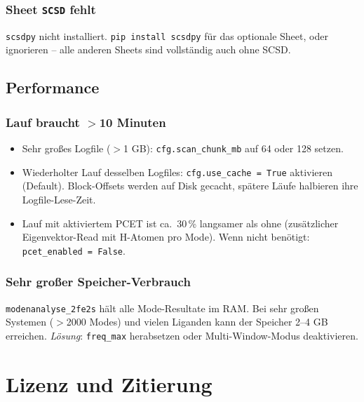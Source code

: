 \documentclass[11pt,a4paper,twoside]{article}
\theoremstyle{remark}
\begin{document}
\subsubsection*{Sheet \texttt{SCSD} fehlt}

\texttt{scsdpy} nicht installiert. \texttt{pip install scsdpy} f\"ur
das optionale Sheet, oder ignorieren -- alle anderen Sheets sind
vollst\"andig auch ohne SCSD.

\subsection{Performance}

\subsubsection*{Lauf braucht $>$10 Minuten}

\begin{itemize}
  \item Sehr gro\ss es Logfile ($>$1 GB): \texttt{cfg.scan\_chunk\_mb}
        auf 64 oder 128 setzen.
  \item Wiederholter Lauf desselben Logfiles: \texttt{cfg.use\_cache =
        True} aktivieren (Default). Block-Offsets werden auf Disk
        gecacht, sp\"atere L\"aufe halbieren ihre Logfile-Lese-Zeit.
  \item Lauf mit aktiviertem PCET ist ca.\ 30\,\% langsamer als ohne
        (zus\"atzlicher Eigenvektor-Read mit H-Atomen pro Mode). Wenn
        nicht ben\"otigt: \texttt{pcet\_enabled = False}.
\end{itemize}

\subsubsection*{Sehr gro\ss er Speicher-Verbrauch}

\texttt{modenanalyse\_2fe2s} h\"alt alle Mode-Resultate im RAM. Bei
sehr gro\ss en Systemen ($>$2000 Modes) und vielen Liganden kann der
Speicher 2--4 GB erreichen. \emph{L\"osung}: \texttt{freq\_max}
herabsetzen oder Multi-Window-Modus deaktivieren.



\section{Lizenz und Zitierung}
\label{sec:lizenz}
\end{document}
